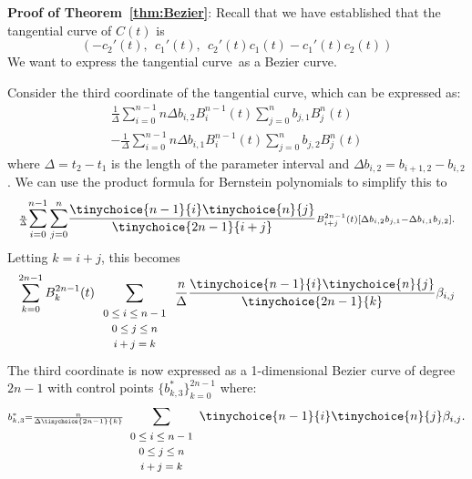 \documentclass[9pt,twocolumn]{article}
\newif\ifJournal
\newcommand{\tang}{tangential curve\ }
\begin{document}
{\bf Proof of Theorem~\ref{thm:Bezier}}:
Recall that we have established that the tangential curve of $C(t)$ is 
\begin{equation}
\label{eq:dual2}
  (-c_2'(t),\ \  c_1'(t),\ \ c_2'(t) c_1(t) - c_1'(t)c_2(t))
\end{equation}
We want to express the \tang as a Bezier curve.
\ifJournal
Distinguish the two $\Delta$'s!  One is parameter length and other
is difference of control points.
\fi
Consider the third coordinate of the tangential curve,
which can be expressed as: 
\[
\begin{array}{l}
\scriptstyle{\frac{1}{\Delta}}
\displaystyle{\sum_{i=0}^{n-1}} \scriptstyle{n \Delta b_{i,2} B_i^{n-1}(t)}
 \displaystyle{\sum_{j=0}^n}     \scriptstyle{         b_{j,1} B_j^n(t)} \\
  - 
\scriptstyle{\frac{1}{\Delta}}
 \displaystyle{\sum_{i=0}^{n-1}} \scriptstyle{n \Delta b_{i,1} B_i^{n-1}(t)}
 \displaystyle{\sum_{j=0}^n}	 \scriptstyle{         b_{j,2} B_j^n(t)}
\end{array}
\]
where $\Delta = t_2 - t_1$ is the length of the parameter interval
and $\Delta b_{i,2} = b_{i+1,2} - b_{i,2}$.
We can use the product formula
for Bernstein polynomials \cite{farin97} to simplify this to
\[
\scriptstyle{\frac{n}{\Delta}}
\displaystyle{\sum_{i=0}^{n-1} \sum_{j=0}^n }
\frac{\tinychoice{n-1}{i} \tinychoice{n}{j}}{ \tinychoice{2n-1}{i+j} } 
\scriptstyle{ B_{i+j}^{2n-1}(t) [ \Delta b_{i,2} b_{j,1} - \Delta b_{i,1} b_{j,2} ]}.
\]
Letting $k=i+j$, this becomes
\[
\sum_{k=0}^{2n-1} B_k^{2n-1}(t) 
\sum_{\begin{array}{c} \mbox{\footnotesize{$0 \leq i \leq n-1$}} \\ 
			     \mbox{\footnotesize{$0 \leq j \leq n$}} \\ 
			     \mbox{\footnotesize{$i+j=k$}}
			     \end{array}}
\frac{n}{\Delta} \frac{ \tinychoice{n-1}{i} \tinychoice{n}{j} }{ \tinychoice{2n-1}{k} }
\beta_{i,j}
\]
The third coordinate is now expressed as a 1-dimensional Bezier curve of 
degree $2n-1$ with control points $\{b^*_{k,3} \}_{k=0}^{2n-1}$ where:
\begin{equation}
\label{eq:dualw2}
\scriptstyle{
b^*_{k,3} = \frac{n}{\Delta \tinychoice{2n-1}{k}}
\displaystyle{\sum_{\begin{array}{c} \mbox{\footnotesize{$0 \leq i \leq n-1$}} \\ 
			     \mbox{\footnotesize{$0 \leq j \leq n$}} \\ 
			     \mbox{\footnotesize{$i+j=k$}}
			     \end{array}}}
\tinychoice{n-1}{i} \tinychoice{n}{j} \beta_{i,j}.
}
\end{equation}
\end{document}
